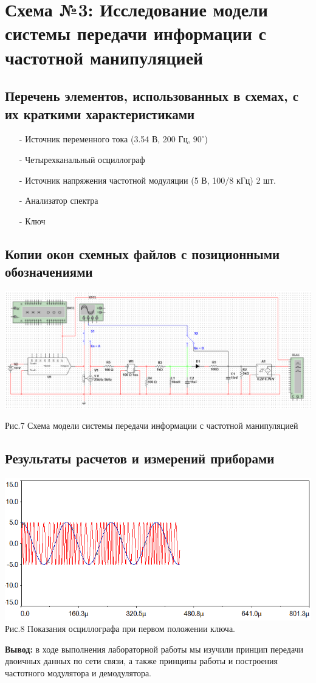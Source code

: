 \documentclass[11pt]{article}
\begin{document}
\newpage
\section{Схема №3: Исследование модели системы передачи информации с частотной манипуляцией}
\subsection{Перечень элементов, использованных в схемах, с
их краткими характеристиками}
\begin{itemize}
    \item[-] Источник переменного тока (3.54 В, 200 Гц, $90^\circ$)
    \item[-] Четырехканальный осциллограф
    \item[-] Источник напряжения частотной модуляции (5 В, 100/8 кГц) 2 шт.
    \item[-] Анализатор спектра 
    \item[-] Ключ
\end{itemize}


\subsection{Копии окон схемных файлов с позиционными обозначениями}
\includegraphics[width=1\linewidth]{img/scheme3.png}
\begin{center}
    Рис.7 Схема модели системы передачи информации с частотной манипуляцией
\end{center}

\subsection{Результаты расчетов и измерений приборами}
\begin{center}
    \includegraphics[width=1\linewidth]{img/osc1.png}
        Рис.8 Показания осциллографа при первом положении ключа.
\end{center}


\textbf{Вывод:} в ходе выполнения лабораторной работы мы изучили принцип передачи двоичных данных по сети связи, а также принципы работы и построения частотного модулятора и демодулятора.
\end{document}
